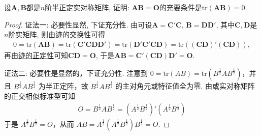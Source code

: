 \documentclass[../../main.tex]{subfiles}%
\begin{document}
\begin{proposition}\label{proposition:A为实半正定阵AB=O的充要条件为tr(AB)=0}
设$\boldsymbol{A}, \boldsymbol{B}$都是$n$阶半正定实对称矩阵, 证明: $\boldsymbol{A}\boldsymbol{B}=\boldsymbol{O}$的充要条件是$\text{tr}(\boldsymbol{A}\boldsymbol{B}) = 0$.
\end{proposition}
\begin{proof}

{\color{blue}证法一:}
必要性显然, 下证充分性. 由可设$\boldsymbol{A}=\boldsymbol{C}'\boldsymbol{C}$, $\boldsymbol{B}=\boldsymbol{D}\boldsymbol{D}'$, 其中$\boldsymbol{C}, \boldsymbol{D}$是$n$阶实矩阵, 则由迹的交换性可得
\begin{align*}
0 = \text{tr}(\boldsymbol{A}\boldsymbol{B}) = \text{tr}(\boldsymbol{C}'\boldsymbol{C}\boldsymbol{D}\boldsymbol{D}') = \text{tr}(\boldsymbol{D}'\boldsymbol{C}'\boldsymbol{C}\boldsymbol{D}) = \text{tr}\left((\boldsymbol{C}\boldsymbol{D})'(\boldsymbol{C}\boldsymbol{D})\right),
\end{align*}
再由\hyperref[proposition:零矩阵的充要条件]{迹的正定性}可知$\boldsymbol{C}\boldsymbol{D}=\boldsymbol{O}$, 于是$\boldsymbol{A}\boldsymbol{B}=\boldsymbol{C}'(\boldsymbol{C}\boldsymbol{D})\boldsymbol{D}'=\boldsymbol{O}$. 

{\color{blue}证法二:}
必要性是显然的，下证充分性. 注意到 \(0 = \mathrm{tr}(AB) = \mathrm{tr}(B^{\frac{1}{2}}AB^{\frac{1}{2}})\)，并且 \(B^{\frac{1}{2}}AB^{\frac{1}{2}}\) 为半正定阵，故 \(B^{\frac{1}{2}}AB^{\frac{1}{2}}\) 的主对角元或特征值全为零. 由或实对称矩阵的正交相似标准型可知
\begin{align*}
O = B^{\frac{1}{2}}AB^{\frac{1}{2}} = (A^{\frac{1}{2}}B^{\frac{1}{2}})'(A^{\frac{1}{2}}B^{\frac{1}{2}})
\end{align*}
于是 \(A^{\frac{1}{2}}B^{\frac{1}{2}} = O\)，从而 \(AB = A^{\frac{1}{2}}(A^{\frac{1}{2}}B^{\frac{1}{2}})B^{\frac{1}{2}} = O\). 
\end{proof}
\end{document}
